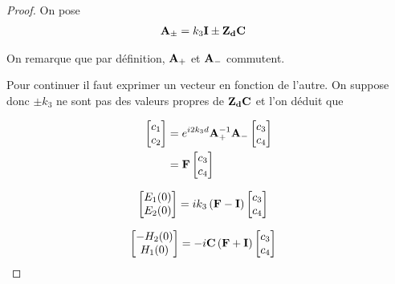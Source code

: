 \begin{proof}
            On pose
            \begin{align}
                \mathbf{A}_\pm &= k_3\mathbf{I} \pm \mathbf{Z_d}\mathbf{C}
            \end{align}

            On remarque que par définition, $\mathbf{A}_+$ et $\mathbf{A}_-$ commutent.

            Pour continuer il faut exprimer un vecteur en fonction de l'autre. On suppose donc $\pm k_3$ ne sont pas des valeurs propres de $\mathbf{Z_d}\mathbf{C}$ et l'on déduit que

            \begin{align}
                \begin{bmatrix}
                    c_1 \\
                    c_2
                \end{bmatrix}
                &= e^{i2 k_3 d} \mathbf{A}_+^{-1}\mathbf{A}_-
                \begin{bmatrix}
                    c_3 \\
                    c_4
                \end{bmatrix}
                \\
                & = \mathbf{F}
                \begin{bmatrix}
                    c_3 \\
                    c_4
                \end{bmatrix}
            \end{align}

            \begin{align}
                \begin{bmatrix}
                    E_1(0)\\
                    E_2(0)\\
                \end{bmatrix}
                &=ik_3\left(\mathbf{F} - \mathbf{I} \right)
                \begin{bmatrix}
                    c_3 \\
                    c_4
                \end{bmatrix}
            \end{align}

            \begin{align}
                \begin{bmatrix}
                    -H_2(0)\\
                    H_1(0)\\
                \end{bmatrix}
                &=-i\mathbf{C} \left(  \mathbf{F} + \mathbf{I}  \right)
                \begin{bmatrix}
                        c_3 \\
                        c_4
                \end{bmatrix}
            \end{align}


\end{proof}
